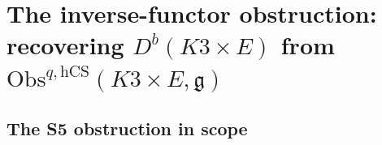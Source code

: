 
\providecommand{\ClaimStatusTheorem}{\textsc{[theorem]}}
\providecommand{\ClaimStatusConjectured}{\textsc{[conjectural]}}
\providecommand{\ClaimStatusHeuristic}{\textsc{[heuristic]}}
\providecommand{\ClaimStatusDefinition}{\textsc{[definition]}}
\providecommand{\ClaimStatusConditional}{\textsc{[conditional]}}
\providecommand{\kch}{\kappa_{\mathrm{ch}}}
\providecommand{\kcat}{\kappa_{\mathrm{cat}}}
\providecommand{\kBKM}{\kappa_{\mathrm{BKM}}}
\providecommand{\kfib}{\kappa_{\mathrm{fiber}}}
\providecommand{\hCS}{\mathrm{hCS}}
\providecommand{\Obs}{\mathrm{Obs}}
\providecommand{\Coh}{\mathrm{Coh}}
\providecommand{\Perf}{\mathrm{Perf}}
\providecommand{\HH}{\mathrm{HH}}
\providecommand{\HC}{\mathrm{HC}}
\providecommand{\frakg}{\mathfrak{g}}
\providecommand{\Ran}{\mathrm{Ran}}
\providecommand{\PhiFA}{\Phi^{\mathrm{FA}}}
\providecommand{\SpCh}{\mathrm{Sp}^{\mathrm{ch}}}
\providecommand{\HolFA}{\mathrm{HolFA}}
\providecommand{\Bun}{\mathrm{Bun}}
\providecommand{\Cob}{\mathrm{Cob}}
\providecommand{\Mod}{\mathrm{Mod}}
\providecommand{\dCat}{\mathrm{Cat}_{(\infty,3)}}
\providecommand{\Vect}{\mathrm{Vect}}
\providecommand{\op}{\mathrm{op}}
\providecommand{\fd}{\mathrm{fd}}
\providecommand{\BL}{\mathrm{BL}}
\providecommand{\Eone}{E_1}
\providecommand{\Etwo}{E_2}
\providecommand{\Ethree}{E_3}
\providecommand{\Ed}{E_d}
\providecommand{\Cas}{\mathrm{Cas}}
\providecommand{\sympl}{\mathrm{sympl}}
\providecommand{\smooth}{\mathrm{sm}}
\providecommand{\nb}[1]{\mathrm{Nb}(#1)}
\providecommand{\IndHilb}{\mathrm{IndHilb}}
\providecommand{\Smith}{\mathrm{Smith}}

\section{The inverse-functor obstruction:
recovering \texorpdfstring{$D^b(K3\times E)$ from $\Obs^{q,\hCS}(K3\times E,\frakg)$}{D-b(K3 x E) from Obs-q-hCS(K3 x E, g)}}
\label{wn:sec:agent08-inverse-functor}

\subsection{The S5 obstruction in scope}
\label{wn:subsec:agent08-S5-scope}

